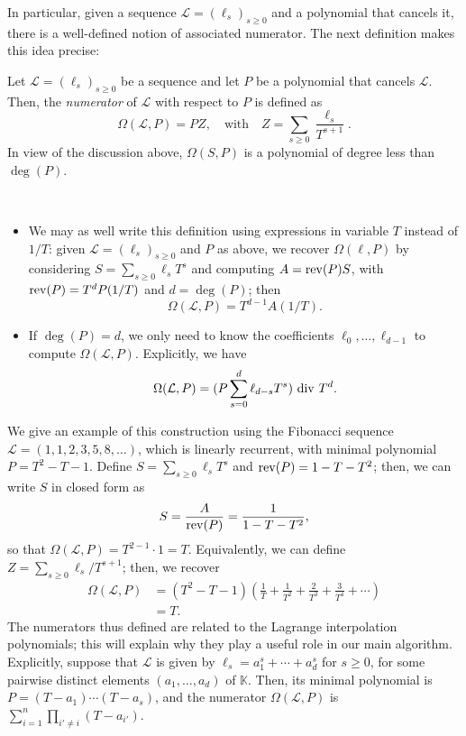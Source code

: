 \documentclass[12pt]{article}
\newcommand{\genseries}{Z}
\newcommand{\minpoly}{P}
\def\K{\mathbb{K}}
\def\K {\ensuremath{\mathbb{K}}}
\begin{document}
In particular, given a sequence $\mathcal{L}=(\ell_s)_{s \ge 0}$ and a
polynomial that cancels it, there is a well-defined notion of
associated numerator.  The next definition makes this idea precise:
\begin{definition}
  \label{def:omega}
  Let $\mathcal{L}=(\ell_s)_{s \ge 0}$ be a sequence and let $P$ be a
  polynomial that cancels $\mathcal{L}$. Then, the {\em numerator} of $\mathcal{L}$
  with respect to $P$ is defined as 
  $$\Omega(\mathcal{L},P) = P \genseries, \quad\text{with}\quad \genseries=\sum_{s \ge 0} \frac
  {\ell_s}{T^{s+1}}.$$ In view of the discussion above, $\Omega(S,P)$
  is a polynomial of degree less than $\deg(P)$.
\end{definition}
\begin{remark}~
  \begin{itemize}
  \item We may as well write this definition using expressions in
    variable $T$ instead of $1/T$: given
    $\mathcal{L}=(\ell_s)_{s\ge0}$ and $P$ as above, we recover
    $\Omega(\ell,P)$ by considering $S=\sum_{s\ge 0} \ell_s
    T^s$ and computing $A = {\rm rev}(P) S$, with ${\rm rev}(P)=T^d
    P(1/T)$ and $d=\deg(P)$; then
    $$\Omega(\mathcal{L} ,P) = T^{d - 1} A (1/T).$$ 
\item If $\deg(P)=d$, we only need to know the coefficients
  $\ell_0,\dots,\ell_{d-1}$ to compute $\Omega(\mathcal{L}, P)$. Explicitly, we 
  have
  $$\Omega(\mathcal{L},P) = ( P \sum_{s=0}^{d} \ell_{d - s} T^s ) {\rm ~div~} T^d.$$
 \end{itemize}
\end{remark}
We give an example of this construction using the Fibonacci sequence $\mathcal{L} =
(1,1,2,3,5,8,\dots)$, which is linearly recurrent, with minimal
polynomial $P=T^2-T-1$. Define $S= \sum_{s\ge 0} \ell_{s} T^s$ and
${\rm rev}(P) = 1-T-T^2$; then, we can write $S$ in closed form as
$$S = \frac{A}{{\rm rev}(P)} = \frac{1}{1-T-T^2},$$
so that $\Omega(\mathcal{L},P)=T^{2-1} \cdot 1=T$. Equivalently, we can define $\genseries = \sum_{s\ge0} \ell_{s}/T^{s+1}$; then, 
we recover 
\begin{align*}
\Omega(\mathcal{L},P) &= (T^2-T-1)\left (\frac 1T +\frac 1{T^2} + \frac 2{T^3} + \frac 3{T^4} + \cdots \right ) \\
&=T.
\end{align*}
The numerators thus defined are related to the Lagrange interpolation
polynomials; this will explain why they play a useful role in our main
algorithm. Explicitly, suppose that $\mathcal{L}$ is given by $\ell_s
= a_1^s + \cdots + a_d^s$ for $s \ge 0$, for some pairwise distinct
elements $(a_1,\dots,a_d)$ of $\K$. Then, its minimal polynomial is
$\minpoly=(T-a_1) \cdots (T-a_s)$, and the numerator
$\Omega(\mathcal{L}, P)$ is $\sum_{i=1}^n \prod_{i'\ne i} (T-a_{i'})$.
\end{document}
